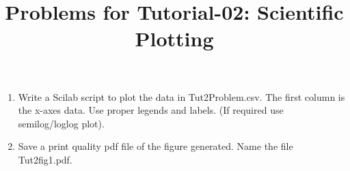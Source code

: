 \documentclass[10pt,a4paper]{article}
\begin{document}
\title{Problems for Tutorial-02: Scientific Plotting}
\date{}
\maketitle
\begin{enumerate}
\item Write a Scilab script to plot the data in Tut2Problem.csv. 
The first column is the x-axes data. Use proper legends and labels.
(If required use semilog/loglog plot).
\item Save a print quality pdf file of the figure generated. Name the 
file Tut2fig1.pdf.
\end{enumerate}
\end{document}
